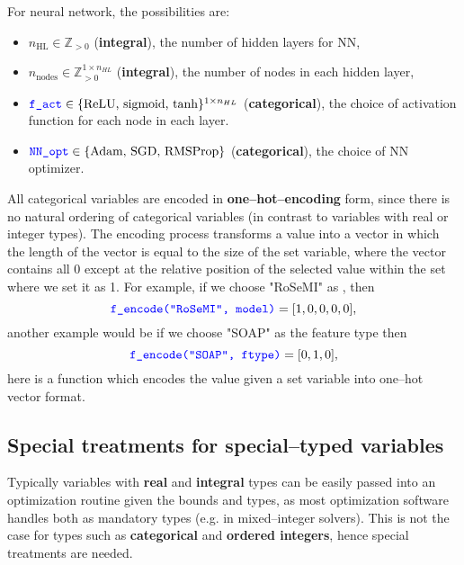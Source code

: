 \documentclass[12pt]{article}
\begin{document}
For neural network, the possibilities are:
\begin{itemize}
	\item $n_\text{HL} \in \mathbb{Z}_{>0}$ (\textbf{integral}), the number of hidden layers for NN,
	\item $n_\text{nodes} \in \mathbb{Z}^{1 \times n_{HL}}_{>0}$ (\textbf{integral}), the number of nodes in each hidden layer,
	\item $\codeword{f_act} \in \{\text{ReLU, sigmoid, tanh}\}^{1 \times n_{HL}}$ (\textbf{categorical}), the choice of activation function for each node in each layer.
	\item $\codeword{NN_opt} \in \{\text{Adam, SGD, RMSProp}\}$ (\textbf{categorical}), the choice of NN optimizer.
\end{itemize}

All categorical variables are encoded in \textbf{one--hot--encoding} form, since there is no natural ordering of categorical variables (in contrast to variables with real or integer types). The encoding process transforms a value into a vector in which the length of the vector is equal to the size of the set variable, where the vector contains all 0 except at the relative position of the selected value within the set where we set it as 1. For example, if we choose "RoSeMI" as , then
\begin{equation*}
	\codeword{f_encode("RoSeMI", model)} = [1,0,0,0,0],
\end{equation*}
another example would be if we choose "SOAP" as the feature type then
\begin{equation*}
	\codeword{f_encode("SOAP", ftype)} = [0,1,0],
\end{equation*}
here  is a function which encodes the value  given a set variable  into one--hot vector format.


\subsection{Special treatments for special--typed variables}
Typically variables with \textbf{real} and \textbf{integral} types can be easily passed into an optimization routine given the bounds and types, as most optimization software handles both as mandatory types (e.g. in mixed--integer solvers). 
This is not the case for types such as \textbf{categorical} and \textbf{ordered integers}, hence special treatments are needed.
\end{document}
